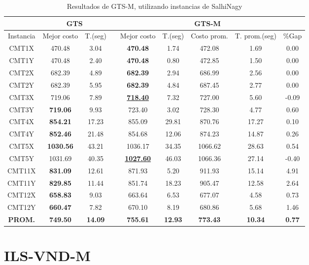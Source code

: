 \begin{table}[h]
\caption{ Resultados de GTS-M, utilizando instancias de SalhiNagy}
\centering
\scriptsize
\begin{tabular*}{1.00\textwidth}{@{\extracolsep{\fill}} |c||c c||c c c c c c|}
\hline
& \multicolumn{2}{c||}{\bf{GTS}} & \multicolumn{6}{c|}{\bf{GTS-M}}\\\hline
Instancia & Mejor costo & T.(seg) & & Mejor costo & T.(seg) & Costo prom. & T. prom.(seg) & \%Gap\\ [0.5ex]
\hline\hline
CMT1X & 470.48 & 3.04 & & \bf{470.48} & 
1.74 & 472.08 & 1.69 & 0.00\\CMT1Y & 470.48 & 2.40 & & \bf{470.48} & 
0.80 & 472.85 & 1.50 & 0.00\\CMT2X & 682.39 & 4.89 & & \bf{682.39} & 
2.94 & 686.99 & 2.56 & 0.00\\CMT2Y & 682.39 & 5.95 & & \bf{682.39} & 
4.84 & 687.45 & 2.77 & 0.00\\CMT3X & 719.06 & 7.89 & & \bf{\underline{718.40}} & 
7.32 & 727.00 & 5.60 & -0.09\\CMT3Y & \bf{719.06} & 9.93 & & 
723.40 & 3.02 & 728.30 & 4.77 & 0.60\\CMT4X & \bf{854.21} & 17.23 & & 
855.09 & 29.81 & 870.76 & 17.27 & 0.10\\CMT4Y & \bf{852.46} & 21.48 & & 
854.68 & 12.06 & 874.23 & 14.87 & 0.26\\CMT5X & \bf{1030.56} & 43.21 & & 
1036.17 & 34.35 & 1066.62 & 28.63 & 0.54\\CMT5Y & 1031.69 & 40.35 & & \bf{\underline{1027.60}} & 
46.03 & 1066.36 & 27.14 & -0.40\\CMT11X & \bf{831.09} & 12.61 & & 
871.93 & 5.20 & 911.93 & 15.14 & 4.91\\CMT11Y & \bf{829.85} & 11.44 & & 
851.74 & 18.23 & 905.47 & 12.58 & 2.64\\CMT12X & \bf{658.83} & 9.03 & & 
663.64 & 6.53 & 677.07 & 4.58 & 0.73\\CMT12Y & \bf{660.47} & 7.82 & & 
670.10 & 8.19 & 680.86 & 5.68 & 1.46\\\hline\hline\bf{PROM.} & 
\bf{749.50} & \bf{14.09} & & \bf{755.61} & \bf{12.93} & \bf{773.43} & \bf{10.34} & \bf{0.77}\\[1ex]\hline
\end{tabular*}
\label{apendice-tabla-final-gtsS}
\end{table}

\clearpage
\section{ILS-VND-M}\label{tablas-finales-ils}


